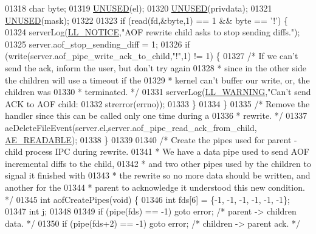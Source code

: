\begin{DoxyCode}
{{{{{{{{{{{{{{{{{{{{{01318     \textcolor{keywordtype}{char} byte;
01319     \hyperlink{server_8h_ae7c9dc8f13568a9c856573751f1ee1ec}{UNUSED}(el);
01320     \hyperlink{server_8h_ae7c9dc8f13568a9c856573751f1ee1ec}{UNUSED}(privdata);
01321     \hyperlink{server_8h_ae7c9dc8f13568a9c856573751f1ee1ec}{UNUSED}(mask);
01322 
01323     \textcolor{keywordflow}{if} (read(fd,&byte,1) == 1 && byte == \textcolor{stringliteral}{'!'}) \{
01324         serverLog(\hyperlink{server_8h_a8c54c191e436c7dd3012167212692401}{LL\_NOTICE},\textcolor{stringliteral}{"AOF rewrite child asks to stop sending diffs."});
01325         server.aof\_stop\_sending\_diff = 1;
01326         \textcolor{keywordflow}{if} (write(server.aof\_pipe\_write\_ack\_to\_child,\textcolor{stringliteral}{"!"},1) != 1) \{
01327             \textcolor{comment}{/* If we can't send the ack, inform the user, but don't try again}
01328 \textcolor{comment}{             * since in the other side the children will use a timeout if the}
01329 \textcolor{comment}{             * kernel can't buffer our write, or, the children was}
01330 \textcolor{comment}{             * terminated. */}
01331             serverLog(\hyperlink{server_8h_a31229b9334bba7d6be2a72970967a14b}{LL\_WARNING},\textcolor{stringliteral}{"Can't send ACK to AOF child: %
01332                 strerror(errno));
01333         \}
01334     \}
01335     \textcolor{comment}{/* Remove the handler since this can be called only one time during a}
01336 \textcolor{comment}{     * rewrite. */}
01337     aeDeleteFileEvent(server.el,server.aof\_pipe\_read\_ack\_from\_child,
      \hyperlink{ae_8h_a7a9a2162d007d09739955b4e55c65bf3}{AE\_READABLE});
01338 \}
01339 
01340 \textcolor{comment}{/* Create the pipes used for parent - child process IPC during rewrite.}
01341 \textcolor{comment}{ * We have a data pipe used to send AOF incremental diffs to the child,}
01342 \textcolor{comment}{ * and two other pipes used by the children to signal it finished with}
01343 \textcolor{comment}{ * the rewrite so no more data should be written, and another for the}
01344 \textcolor{comment}{ * parent to acknowledge it understood this new condition. */}
01345 \textcolor{keywordtype}{int} aofCreatePipes(\textcolor{keywordtype}{void}) \{
01346     \textcolor{keywordtype}{int} fds[6] = \{-1, -1, -1, -1, -1, -1\};
01347     \textcolor{keywordtype}{int} j;
01348 
01349     \textcolor{keywordflow}{if} (pipe(fds) == -1) \textcolor{keywordflow}{goto} error; \textcolor{comment}{/* parent -> children data. */}
01350     \textcolor{keywordflow}{if} (pipe(fds+2) == -1) \textcolor{keywordflow}{goto} error; \textcolor{comment}{/* children -> parent ack. */}
}}}}}}}}}}}}}}}}}}}}}}
\end{DoxyCode}
